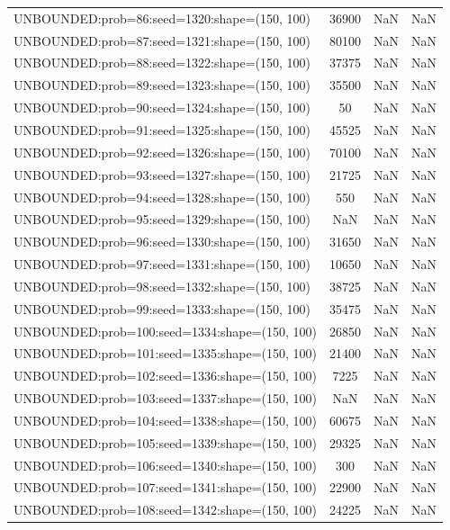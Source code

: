\begin{longtable}{lccc}
UNBOUNDED:prob=86:seed=1320:shape=(150, 100)  & 36900 &   NaN &    NaN \\
UNBOUNDED:prob=87:seed=1321:shape=(150, 100)  & 80100 &   NaN &    NaN \\
UNBOUNDED:prob=88:seed=1322:shape=(150, 100)  & 37375 &   NaN &    NaN \\
UNBOUNDED:prob=89:seed=1323:shape=(150, 100)  & 35500 &   NaN &    NaN \\
UNBOUNDED:prob=90:seed=1324:shape=(150, 100)  &    50 &   NaN &    NaN \\
UNBOUNDED:prob=91:seed=1325:shape=(150, 100)  & 45525 &   NaN &    NaN \\
UNBOUNDED:prob=92:seed=1326:shape=(150, 100)  & 70100 &   NaN &    NaN \\
UNBOUNDED:prob=93:seed=1327:shape=(150, 100)  & 21725 &   NaN &    NaN \\
UNBOUNDED:prob=94:seed=1328:shape=(150, 100)  &   550 &   NaN &    NaN \\
UNBOUNDED:prob=95:seed=1329:shape=(150, 100)  &   NaN &   NaN &    NaN \\
UNBOUNDED:prob=96:seed=1330:shape=(150, 100)  & 31650 &   NaN &    NaN \\
UNBOUNDED:prob=97:seed=1331:shape=(150, 100)  & 10650 &   NaN &    NaN \\
UNBOUNDED:prob=98:seed=1332:shape=(150, 100)  & 38725 &   NaN &    NaN \\
UNBOUNDED:prob=99:seed=1333:shape=(150, 100)  & 35475 &   NaN &    NaN \\
UNBOUNDED:prob=100:seed=1334:shape=(150, 100) & 26850 &   NaN &    NaN \\
UNBOUNDED:prob=101:seed=1335:shape=(150, 100) & 21400 &   NaN &    NaN \\
UNBOUNDED:prob=102:seed=1336:shape=(150, 100) &  7225 &   NaN &    NaN \\
UNBOUNDED:prob=103:seed=1337:shape=(150, 100) &   NaN &   NaN &    NaN \\
UNBOUNDED:prob=104:seed=1338:shape=(150, 100) & 60675 &   NaN &    NaN \\
UNBOUNDED:prob=105:seed=1339:shape=(150, 100) & 29325 &   NaN &    NaN \\
UNBOUNDED:prob=106:seed=1340:shape=(150, 100) &   300 &   NaN &    NaN \\
UNBOUNDED:prob=107:seed=1341:shape=(150, 100) & 22900 &   NaN &    NaN \\
UNBOUNDED:prob=108:seed=1342:shape=(150, 100) & 24225 &   NaN &    NaN \\

\end{longtable}
